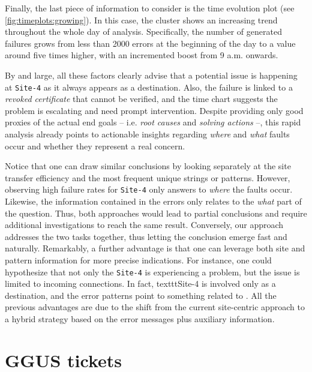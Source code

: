 Finally, the last piece of information to consider is the time evolution plot (see \cref{fig:timeplots:growing}). 
In this case, the cluster shows an increasing trend throughout the whole day of analysis. Specifically, the number of generated failures grows from less than 2000 errors at the beginning of the day to a value around five times higher, with an incremented boost from 9 a.m. onwards.

By and large, all these factors clearly advise that a potential issue is happening at \texttt{Site-4} as it always appears as a destination. Also, the failure is linked to a \textit{revoked certificate} that cannot be verified, and the time chart suggests the problem is escalating and need prompt intervention.
Despite providing only good proxies of the actual end goals -- i.e. \textit{root causes} and \textit{solving actions} --, this rapid analysis already points to actionable insights regarding \textit{where} and \textit{what} faults occur and whether they represent a real concern.

Notice that one can draw similar conclusions by looking separately at the site transfer efficiency and the most frequent unique strings or patterns. 
However, observing high failure rates for \texttt{Site-4} only answers to \textit{where} the faults occur. 
Likewise, the information contained in the errors only relates to the \textit{what} part of the question.
Thus, both approaches would lead to partial conclusions and require additional investigations to reach the same result.
Conversely, our approach addresses the two tasks together, thus letting the conclusion emerge fast and naturally. 
Remarkably, a further advantage is that one can leverage both site and pattern information for more precise indications.
For instance, one could hypothesize that not only the \texttt{Site-4} is experiencing a problem, but the issue is limited to incoming connections. In fact, texttt{Site-4} is involved only as a destination, and the error patterns point to something related to .
All the previous advantages are due to the shift from the current site-centric approach to a hybrid strategy based on the error messages plus auxiliary information.


\section{GGUS tickets}


